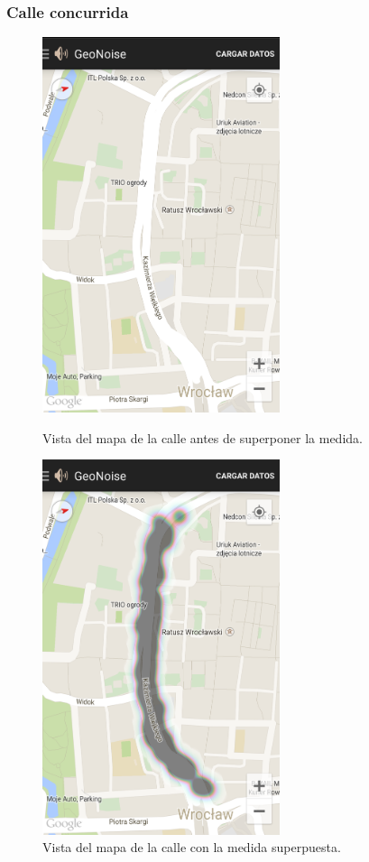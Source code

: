 \subsubsection{Calle concurrida}
\begin{figure}[H] \centering
 \begin{minipage}{0.45\textwidth}\centering
    \includegraphics[height=11cm]{graphs/road.png} \caption{Vista del mapa de la calle antes de superponer la medida.}\label{fig:screen:road}
 \end{minipage}
 \hfill
\begin{minipage}{0.45\textwidth}\centering
    \includegraphics[height=11cm]{graphs/roadmapped.png} \caption{Vista del mapa de la calle con la medida superpuesta.}\label{fig:screen:roadmapped}
\end{minipage}
\end{figure}
